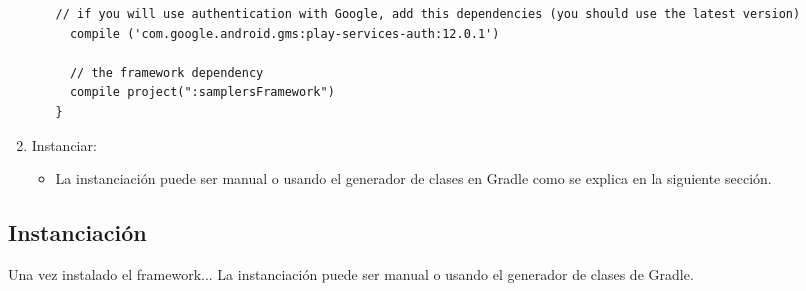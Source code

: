 \begin{enumerate}
\begin{itemize}
\begin{lstlisting}[language=XML, frame=tlb]
  // if you will use authentication with Google, add this dependencies (you should use the latest version)
  compile ('com.google.android.gms:play-services-auth:12.0.1')

  // the framework dependency
  compile project(":samplersFramework")
}
			\end{lstlisting}	
		\end{itemize}	

	\item Instanciar:
		\begin{itemize}
		\item La instanciación puede ser manual o usando el generador de clases en Gradle como se explica en la siguiente sección.
		\end{itemize}
\end{enumerate}	

\subsection{Instanciación}
Una vez instalado el framework...
La instanciación puede ser manual o usando el generador de clases de Gradle.

